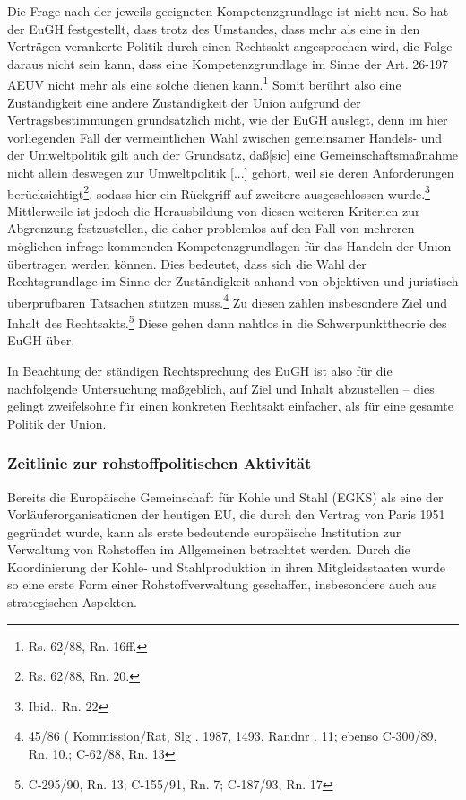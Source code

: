 \documentclass[12pt,a4paper,oneside]{book} %
\begin{document}
	Die Frage nach der jeweils geeigneten Kompetenzgrundlage ist nicht neu. So hat der EuGH festgestellt, dass trotz des Umstandes, dass mehr als eine in den Verträgen verankerte Politik durch einen Rechtsakt angesprochen wird, die Folge daraus nicht sein kann, dass eine Kompetenzgrundlage im Sinne der Art. 26-197 AEUV nicht mehr als eine solche dienen kann.\footnote{Rs. 62/88, Rn. 16ff.} Somit berührt also eine Zuständigkeit eine andere Zuständigkeit der Union aufgrund der Vertragsbestimmungen grundsätzlich nicht, wie der EuGH auslegt, denn im hier vorliegenden Fall der vermeintlichen Wahl zwischen gemeinsamer Handels- und der Umweltpolitik gilt auch der Grundsatz, \glqq daß[sic] eine Gemeinschaftsmaßnahme nicht allein deswegen zur Umweltpolitik [...] gehört, weil sie deren Anforderungen berücksichtigt\grqq\footnote{Rs. 62/88, Rn. 20.}, sodass hier ein Rückgriff auf zweitere ausgeschlossen wurde.\footnote{Ibid., Rn. 22} Mittlerweile ist jedoch die Herausbildung von diesen weiteren Kriterien zur Abgrenzung festzustellen, die daher problemlos auf den Fall von mehreren möglichen infrage kommenden Kompetenzgrundlagen für das Handeln der Union übertragen werden können.\autocite{Callies, Berliner Beiträge Nr. 117, S. 11.} Dies bedeutet, dass sich die Wahl der Rechtsgrundlage im Sinne der Zuständigkeit anhand von objektiven und juristisch überprüfbaren Tatsachen stützen muss.\footnote{45/86 ( Kommission/Rat, Slg . 1987, 1493, Randnr . 11; ebenso C-300/89, Rn. 10.; C-62/88, Rn. 13} Zu diesen zählen insbesondere Ziel und Inhalt des Rechtsakts.\footnote{C-295/90, Rn. 13; C-155/91, Rn. 7; C-187/93, Rn. 17} Diese gehen dann nahtlos in die Schwerpunkttheorie des EuGH über.
	
	In Beachtung der ständigen Rechtsprechung des EuGH ist also für die nachfolgende Untersuchung maßgeblich, auf Ziel und Inhalt abzustellen -- dies gelingt zweifelsohne für einen konkreten Rechtsakt einfacher, als für eine gesamte Politik der Union.
	
	\subsubsection{Zeitlinie zur rohstoffpolitischen Aktivität}
	
	Bereits die Europäische Gemeinschaft für Kohle und Stahl (EGKS) als eine der Vorläuferorganisationen der heutigen EU, die durch den Vertrag von Paris 1951 gegründet wurde, kann als erste bedeutende europäische Institution zur Verwaltung von Rohstoffen im Allgemeinen betrachtet werden. Durch die Koordinierung der Kohle- und Stahlproduktion in ihren Mitgleidsstaaten wurde so eine erste Form einer Rohstoffverwaltung geschaffen, insbesondere auch aus strategischen Aspekten.%
	
\end{document}

